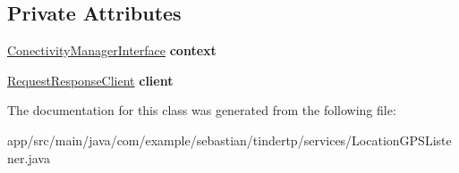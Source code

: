 \subsection*{Private Attributes}
\begin{DoxyCompactItemize}
\item 
\hyperlink{interfacecom_1_1example_1_1sebastian_1_1tindertp_1_1Interfaces_1_1ConectivityManagerInterface}{Conectivity\+Manager\+Interface} {\bfseries context}\hypertarget{classcom_1_1example_1_1sebastian_1_1tindertp_1_1services_1_1LocationGPSListener_ae8dc549b33e7d1f111d3f601f1931c14}{}\label{classcom_1_1example_1_1sebastian_1_1tindertp_1_1services_1_1LocationGPSListener_ae8dc549b33e7d1f111d3f601f1931c14}

\item 
\hyperlink{classcom_1_1example_1_1sebastian_1_1tindertp_1_1internetTools_1_1RequestResponseClient}{Request\+Response\+Client} {\bfseries client}\hypertarget{classcom_1_1example_1_1sebastian_1_1tindertp_1_1services_1_1LocationGPSListener_a891a4d088af3687a153941ee77672f6e}{}\label{classcom_1_1example_1_1sebastian_1_1tindertp_1_1services_1_1LocationGPSListener_a891a4d088af3687a153941ee77672f6e}

\end{DoxyCompactItemize}


The documentation for this class was generated from the following file\+:\begin{DoxyCompactItemize}
\item 
app/src/main/java/com/example/sebastian/tindertp/services/Location\+G\+P\+S\+Listener.\+java\end{DoxyCompactItemize}
